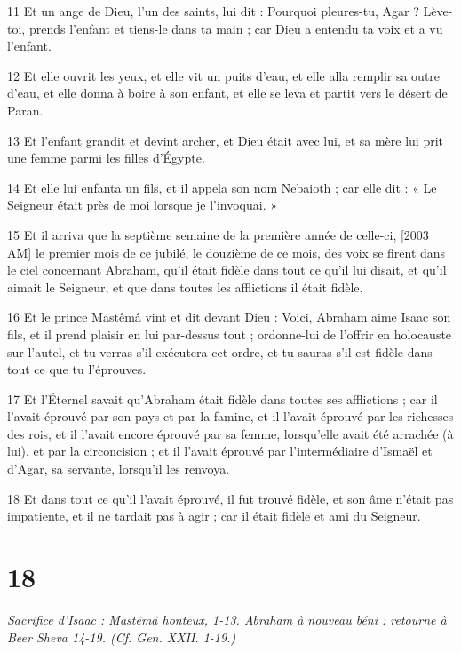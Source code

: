 \par 11 Et un ange de Dieu, l'un des saints, lui dit : Pourquoi pleures-tu, Agar ? Lève-toi, prends l’enfant et tiens-le dans ta main ; car Dieu a entendu ta voix et a vu l'enfant.
\par 12 Et elle ouvrit les yeux, et elle vit un puits d'eau, et elle alla remplir sa outre d'eau, et elle donna à boire à son enfant, et elle se leva et partit vers le désert de Paran.
\par 13 Et l'enfant grandit et devint archer, et Dieu était avec lui, et sa mère lui prit une femme parmi les filles d'Égypte.
\par 14 Et elle lui enfanta un fils, et il appela son nom Nebaioth ; car elle dit : « Le Seigneur était près de moi lorsque je l'invoquai. »
\par 15 Et il arriva que la septième semaine de la première année de celle-ci, [2003 AM] le premier mois de ce jubilé, le douzième de ce mois, des voix se firent dans le ciel concernant Abraham, qu'il était fidèle dans tout ce qu'il lui disait, et qu'il aimait le Seigneur, et que dans toutes les afflictions il était fidèle.
\par 16 Et le prince Mastêmâ vint et dit devant Dieu : Voici, Abraham aime Isaac son fils, et il prend plaisir en lui par-dessus tout ; ordonne-lui de l'offrir en holocauste sur l'autel, et tu verras s'il exécutera cet ordre, et tu sauras s'il est fidèle dans tout ce que tu l'éprouves.
\par 17 Et l'Éternel savait qu'Abraham était fidèle dans toutes ses afflictions ; car il l'avait éprouvé par son pays et par la famine, et il l'avait éprouvé par les richesses des rois, et il l'avait encore éprouvé par sa femme, lorsqu'elle avait été arrachée (à lui), et par la circoncision ; et il l'avait éprouvé par l'intermédiaire d'Ismaël et d'Agar, sa servante, lorsqu'il les renvoya.
\par 18 Et dans tout ce qu'il l'avait éprouvé, il fut trouvé fidèle, et son âme n'était pas impatiente, et il ne tardait pas à agir ; car il était fidèle et ami du Seigneur.

\chapter{18}

\par \textit{Sacrifice d'Isaac : Mastêmâ honteux, 1-13. Abraham à nouveau béni : retourne à Beer Sheva 14-19. (Cf. Gen. XXII. 1-19.)}

